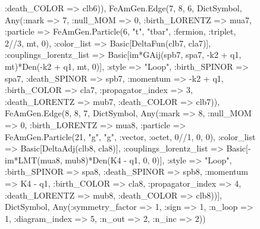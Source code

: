 \documentclass{revtex4}
\begin{document}
\begin{figure}[!htb]
\begin{center}
{:death_COLOR => clb6)), FeAmGen.Edge(7, 8, 6, Dict{Symbol, Any}(:mark => 7, :null_MOM => 0, :birth_LORENTZ => mua7, :particle => FeAmGen.Particle(6, "t", "tbar", :fermion, :triplet, 2//3, mt, 0), :color_list => Basic[DeltaFun(clb7, cla7)], :couplings_lorentz_list => Basic[im*GAij(spb7, spa7, -k2 + q1, mt)*Den(-k2 + q1, mt, 0)], :style => "Loop", :birth_SPINOR => spa7, :death_SPINOR => spb7, :momentum => -k2 + q1, :birth_COLOR => cla7, :propagator_index => 3, :death_LORENTZ => mub7, :death_COLOR => clb7)), FeAmGen.Edge(8, 8, 7, Dict{Symbol, Any}(:mark => 8, :null_MOM => 0, :birth_LORENTZ => mua8, :particle => FeAmGen.Particle(21, "g", "g", :vector, :octet, 0//1, 0, 0), :color_list => Basic[DeltaAdj(clb8, cla8)], :couplings_lorentz_list => Basic[-im*LMT(mua8, mub8)*Den(K4 - q1, 0, 0)], :style => "Loop", :birth_SPINOR => spa8, :death_SPINOR => spb8, :momentum => K4 - q1, :birth_COLOR => cla8, :propagator_index => 4, :death_LORENTZ => mub8, :death_COLOR => clb8))], Dict{Symbol, Any}(:symmetry_factor => 1, :sign => 1, :n_loop => 1, :diagram_index => 5, :n_out => 2, :n_inc => 2)) 
}
\end{center}
\end{figure}
\end{document}
